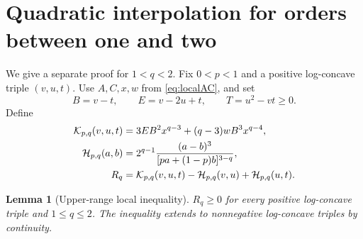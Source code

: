 \documentclass[11pt,a4paper]{amsart}
\numberwithin{equation}{section}
\newtheorem{lemma}[theorem]{Lemma}
\theoremstyle{remark}
\begin{document}
\section{Quadratic interpolation for orders between one and two}
\label{sec:upper}

We give a separate proof for $1<q<2$. Fix $0<p<1$ and a positive
log-concave triple $(v,u,t)$. Use $A,C,x,w$ from
\eqref{eq:localAC}, and set
\[
B=v-t,\qquad E=v-2u+t,\qquad T=u^2-vt\ge0.
\]
Define
\begin{align}
\mathcal K_{p,q}(v,u,t)
 &=3EB^2x^{q-3}+(q-3)wB^3x^{q-4},\notag\\
\mathcal H_{p,q}(a,b)
 &=2^{q-1}\frac{(a-b)^3}{[pa+(1-p)b]^{3-q}},\notag\\
R_q&=\mathcal K_{p,q}(v,u,t)
       -\mathcal H_{p,q}(v,u)+\mathcal H_{p,q}(u,t).
\label{eq:upperR}
\end{align}

\begin{lemma}[Upper-range local inequality]
\label{lem:upperlocal}
$R_q\ge0$ for every positive log-concave triple and $1\le q\le2$.
The inequality extends to nonnegative log-concave triples by continuity.
\end{lemma}
\end{document}
